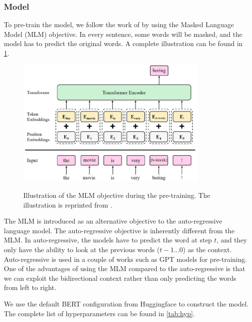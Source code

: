 \subsubsection{Model}
To pre-train the model, we follow the work of \cite{devlin2018bert} by using the Masked Language Model (MLM) objective. In every sentence, some words will be masked, and the model has to predict the original words. A complete illustration can be found in \cref{img:mlmobj}.

\begin{figure}[h]
    {\includegraphics[width=0.85\textwidth]{img/mlm_obj.png}}
    \centering
    \caption{Illustration of the MLM objective during the pre-training. The illustration is reprinted from \cite{Park2019SelfSupervisedCD}.}
    \label{img:mlmobj}
\end{figure}

The MLM is introduced as an alternative objective to the auto-regressive language model. The auto-regressive objective is inherently different from the MLM. In auto-regressive, the models have to predict the word at step $t$, and they only have the ability to look at the previous words ($t-1...0$) as the context. Auto-regressive is used in a couple of works such as GPT models  for pre-training. One of the advantages of using the MLM compared to the auto-regressive is that we can exploit the bidirectional context rather than only predicting the words from left to right.

We use the default BERT configuration from Huggingface to construct the model. The complete list of hyperparameters can be found in \cref{tab:hyp}.

